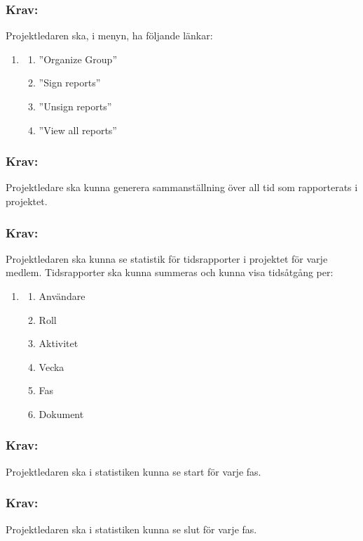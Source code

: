 \documentclass[paper=a4, fontsize=11pt,twoside]{article}
\begin{document}
\subsubsection{Krav:}
Projektledaren ska, i menyn, ha följande länkar:
\begin{enumerate}
\item[]
\begin{enumerate}
\item ”Organize Group”
\item ”Sign reports”
\item ”Unsign reports”
\item ”View all reports”
\end{enumerate}
\end{enumerate}

\subsubsection{Krav:}
Projektledare ska kunna generera sammanställning över all tid som rapporterats i projektet.


\subsubsection{Krav:}
Projektledaren ska kunna se statistik för tidsrapporter i projektet för varje medlem.
Tidsrapporter ska kunna summeras och kunna visa tidsåtgång per:
\begin{enumerate}
\item[]
\begin{enumerate}
\item Användare
\item Roll
\item Aktivitet
\item Vecka
\item Fas
\item Dokument
	\end{enumerate}
\end{enumerate}
\subsubsection{Krav:}
Projektledaren ska i statistiken kunna se start för varje fas.
\subsubsection{Krav:}
Projektledaren ska i statistiken kunna se slut för varje fas.

\end{document}
